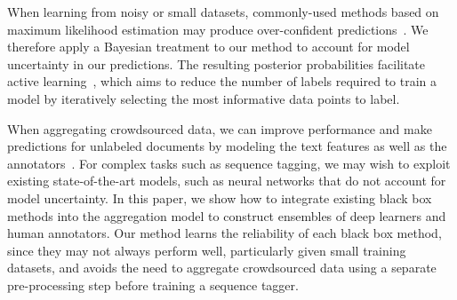 When learning from noisy or small datasets, commonly-used
methods based on maximum likelihood estimation may produce over-confident predictions~\cite{xiong2011bayesian,srivastava2014dropout}. 
We therefore apply a Bayesian treatment to our method to account for model uncertainty in our predictions.
The resulting posterior probabilities facilitate active learning~\cite{settles2010active},
which aims to reduce the number of labels required to train a 
model by iteratively
selecting the most informative data points to label.

When aggregating crowdsourced data, we can improve performance and 
make predictions for unlabeled documents by modeling the text features as well as the annotators~\cite{simpson2015language,Felt2016SemanticAA}.
For complex tasks such as sequence tagging, 
we may wish to exploit existing state-of-the-art models, such as neural networks
that do not account for model uncertainty.
In this paper, we show how to integrate existing black box methods into the aggregation model 
to construct ensembles of deep learners and human annotators. 
Our method learns the reliability of each black box method,
since they may not always perform well, particularly given small training datasets,
and avoids the need to aggregate crowdsourced data using a separate pre-processing step 
before training a sequence tagger.


%

